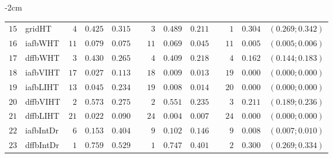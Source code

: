 \begin{table*}[!htbp]
\begin{adjustwidth*}{}{-2cm}
\begin{tabular}{@{}rlrrrrrrrrrcc@{}}
\footnotesize{$15$} & \footnotesize{gridHT   } & \footnotesize{$4 $} & \footnotesize{$0.425$} & \footnotesize{$0.315$} && \footnotesize{$3 $} & \footnotesize{$0.489$} & \footnotesize{$0.211$} && \footnotesize{$1 $} & \footnotesize{$0.304$} & \footnotesize{$(0.269;0.342)$} \\
\footnotesize{$16$} & \footnotesize{iafbWHT  } & \footnotesize{$11$} & \footnotesize{$0.079$} & \footnotesize{$0.075$} && \footnotesize{$11$} & \footnotesize{$0.069$} & \footnotesize{$0.045$} && \footnotesize{$11$} & \footnotesize{$0.005$} & \footnotesize{$(0.005;0.006)$} \\
\footnotesize{$17$} & \footnotesize{dffbWHT  } & \footnotesize{$3 $} & \footnotesize{$0.430$} & \footnotesize{$0.265$} && \footnotesize{$4 $} & \footnotesize{$0.409$} & \footnotesize{$0.218$} && \footnotesize{$4 $} & \footnotesize{$0.162$} & \footnotesize{$(0.144;0.183)$} \\
\footnotesize{$18$} & \footnotesize{iafbVIHT } & \footnotesize{$17$} & \footnotesize{$0.027$} & \footnotesize{$0.113$} && \footnotesize{$18$} & \footnotesize{$0.009$} & \footnotesize{$0.013$} && \footnotesize{$19$} & \footnotesize{$0.000$} & \footnotesize{$(0.000;0.000)$} \\
\footnotesize{$19$} & \footnotesize{iafbLIHT } & \footnotesize{$13$} & \footnotesize{$0.045$} & \footnotesize{$0.234$} && \footnotesize{$19$} & \footnotesize{$0.008$} & \footnotesize{$0.014$} && \footnotesize{$20$} & \footnotesize{$0.000$} & \footnotesize{$(0.000;0.000)$} \\
\footnotesize{$20$} & \footnotesize{dffbVIHT } & \footnotesize{$2 $} & \footnotesize{$0.573$} & \footnotesize{$0.275$} && \footnotesize{$2 $} & \footnotesize{$0.551$} & \footnotesize{$0.235$} && \footnotesize{$3 $} & \footnotesize{$0.211$} & \footnotesize{$(0.189;0.236)$} \\
\footnotesize{$21$} & \footnotesize{dffbLIHT } & \footnotesize{$21$} & \footnotesize{$0.022$} & \footnotesize{$0.090$} && \footnotesize{$24$} & \footnotesize{$0.004$} & \footnotesize{$0.007$} && \footnotesize{$24$} & \footnotesize{$0.000$} & \footnotesize{$(0.000;0.000)$} \\
\footnotesize{$22$} & \footnotesize{iafbIntDr} & \footnotesize{$6 $} & \footnotesize{$0.153$} & \footnotesize{$0.404$} && \footnotesize{$9 $} & \footnotesize{$0.102$} & \footnotesize{$0.146$} && \footnotesize{$9 $} & \footnotesize{$0.008$} & \footnotesize{$(0.007;0.010)$} \\
\footnotesize{$23$} & \footnotesize{dffbIntDr} & \footnotesize{$1 $} & \footnotesize{$0.759$} & \footnotesize{$0.529$} && \footnotesize{$1 $} & \footnotesize{$0.747$} & \footnotesize{$0.401$} && \footnotesize{$2 $} & \footnotesize{$0.300$} & \footnotesize{$(0.269;0.334)$} \\

\end{tabular}
\end{adjustwidth*}
\end{table*}
